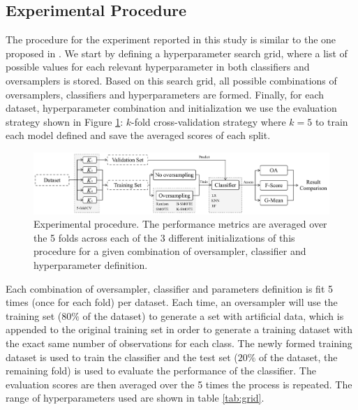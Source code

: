 \documentclass[parskip=full]{scrartcl}
\begin{document}
\subsection{Experimental Procedure}

The procedure for the experiment reported in this study is similar to the one
proposed in \cite{Douzas2019rs}. We start by defining a hyperparameter search
grid, where a list of possible values for each relevant hyperparameter in both
classifiers and oversamplers is stored. Based on this search grid, all possible
combinations of oversamplers, classifiers and hyperparameters are formed.
Finally, for each dataset, hyperparameter combination and initialization we use
the evaluation strategy shown in Figure \ref{fig:experiment_pipeline}: $k$-fold
cross-validation strategy where $k=5$ to train each model defined and save the
averaged scores of each split.

\begin{figure}[H]
	\centering
	\includegraphics[width=1\linewidth]{../analysis/experiment_pipeline}
	\caption{Experimental procedure. The performance metrics are averaged over
    the 5 folds across each of the 3 different initializations of this procedure
    for a given combination of oversampler, classifier and hyperparameter
    definition.}
	\label{fig:experiment_pipeline}
\end{figure}

Each combination of oversampler, classifier and parameters definition is fit 5
times (once for each fold) per dataset. Each time, an oversampler will use the
training set ($80\%$ of the dataset) to generate a set with artificial data,
which is appended to the original training set in order to generate a training
dataset with the exact same number of observations for each class. The newly
formed training dataset is used to train the classifier and the test set ($20\%$
of the dataset, the remaining fold) is used to evaluate the performance of the
classifier. The evaluation scores are then averaged over the 5 times the process
is repeated. The range of hyperparameters used are shown in table
\ref{tab:grid}.
\end{document}
